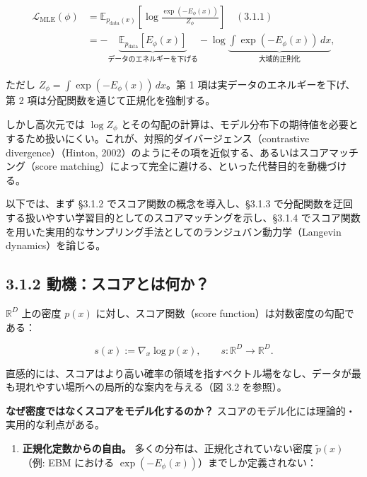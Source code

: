 \begin{align*}
\begin{aligned}
\mathcal{L}_{\mathrm{MLE}}(\phi)
&= \mathbb{E}_{p_{\mathrm{data}}(x)}\!\left[\log \frac{\exp(-E_\phi(x))}{Z_\phi}\right]
\quad (3.1.1)\\
&= -\underbrace{\mathbb{E}_{p_{\mathrm{data}}}[E_\phi(x)]}_{\text{データのエネルギーを下げる}}
- \log \underbrace{\int \exp(-E_\phi(x))\, dx}_{\text{大域的正則化}},
\end{aligned}
\end{align*}


ただし $Z_\phi = \int \exp(-E_\phi(x))\, dx$。第 1 項は実データのエネルギーを下げ、第 2 項は分配関数を通じて正規化を強制する。

しかし高次元では $\log Z_\phi$ とその勾配の計算は、モデル分布下の期待値を必要とするため扱いにくい。これが、対照的ダイバージェンス（contrastive divergence）（Hinton, 2002）のようにその項を近似する、あるいはスコアマッチング（score matching）によって完全に避ける、といった代替目的を動機づける。

以下では、まず §3.1.2 でスコア関数の概念を導入し、§3.1.3 で分配関数を迂回する扱いやすい学習目的としてのスコアマッチングを示し、§3.1.4 でスコア関数を用いた実用的なサンプリング手法としてのランジュバン動力学（Langevin dynamics）を論じる。

\subsection*{3.1.2 動機：スコアとは何か？}


$\mathbb{R}^D$ 上の密度 $p(x)$ に対し、スコア関数（score function）は対数密度の勾配である：

\[
s(x) := \nabla_x \log p(x), \qquad s : \mathbb{R}^D \to \mathbb{R}^D.
\]


直感的には、スコアはより高い確率の領域を指すベクトル場をなし、データが最も現れやすい場所への局所的な案内を与える（図 3.2 を参照）。



\textbf{なぜ密度ではなくスコアをモデル化するのか？} スコアのモデル化には理論的・実用的な利点がある。

\begin{enumerate}
\item \textbf{正規化定数からの自由。} 多くの分布は、正規化されていない密度 $\tilde{p}(x)$（例: EBM における $\exp(-E_\phi(x))$）までしか定義されない：
\end{enumerate}


